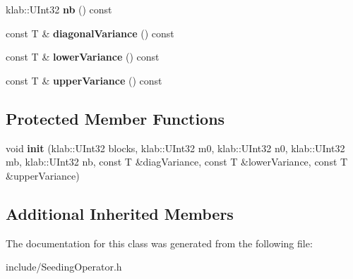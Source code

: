 \begin{DoxyCompactItemize}
\item 
klab\+::\+U\+Int32 {\bfseries nb} () const \hypertarget{classkl1p_1_1TSeedingOperator_a3223cb8a0302fa2f8e4a8f0fc89b83bf}{}\label{classkl1p_1_1TSeedingOperator_a3223cb8a0302fa2f8e4a8f0fc89b83bf}

\item 
const T \& {\bfseries diagonal\+Variance} () const \hypertarget{classkl1p_1_1TSeedingOperator_a1565b5f345e658325e7379441a8c62b2}{}\label{classkl1p_1_1TSeedingOperator_a1565b5f345e658325e7379441a8c62b2}

\item 
const T \& {\bfseries lower\+Variance} () const \hypertarget{classkl1p_1_1TSeedingOperator_ace2ecb22a68664415e352eccd460a244}{}\label{classkl1p_1_1TSeedingOperator_ace2ecb22a68664415e352eccd460a244}

\item 
const T \& {\bfseries upper\+Variance} () const \hypertarget{classkl1p_1_1TSeedingOperator_a6896516ed69e57b77ded60125bafa4fe}{}\label{classkl1p_1_1TSeedingOperator_a6896516ed69e57b77ded60125bafa4fe}

\end{DoxyCompactItemize}
\subsection*{Protected Member Functions}
\begin{DoxyCompactItemize}
\item 
void {\bfseries init} (klab\+::\+U\+Int32 blocks, klab\+::\+U\+Int32 m0, klab\+::\+U\+Int32 n0, klab\+::\+U\+Int32 mb, klab\+::\+U\+Int32 nb, const T \&diag\+Variance, const T \&lower\+Variance, const T \&upper\+Variance)\hypertarget{classkl1p_1_1TSeedingOperator_a3d8e3e798f2f539d9d2d018626d9ba86}{}\label{classkl1p_1_1TSeedingOperator_a3d8e3e798f2f539d9d2d018626d9ba86}

\end{DoxyCompactItemize}
\subsection*{Additional Inherited Members}


The documentation for this class was generated from the following file\+:\begin{DoxyCompactItemize}
\item 
include/Seeding\+Operator.\+h\end{DoxyCompactItemize}
